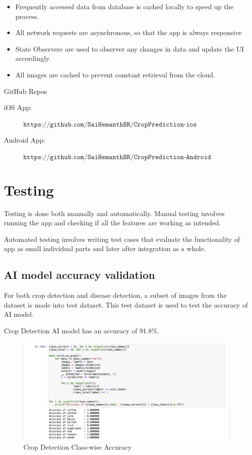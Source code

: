 \documentclass[../Report.tex]{subfiles}
\begin{document}
\begin{itemize}
  \item Frequently accessed data from database is cached locally to speed up the process.
  \item All network requests are asynchronous, so that the app is always responsive
  \item State Observers are used to observer any changes in data and update the UI accordingly.
  \item All images are cached to prevent constant retrieval from the cloud.
\end{itemize}

\noindent
GitHub Repos
\begin{description}
  \item [iOS App:] $\texttt{https://github.com/SaiHemanthBR/CropPrediction-ios}$
  \item[Android App:] $\texttt{https://github.com/SaiHemanthBR/CropPrediction-Android}$
\end{description}

\section{Testing}

Testing is done both manually and automatically. Manual testing involves running the app and checking if all the features are working as 
intended.\par
Automated testing involves writing test cases that evaluate the functionality of app as small individual parts and later after integration 
as a whole.

\subsection{AI model accuracy validation} \label{sec:ai_testing}

For both crop detection and disease detection, a subset of images from the dataset is made into test dataset. This test dataset is used to 
test the accuracy of AI model.\par

Crop Detection AI model has an accuracy of 91.8\%.
\begin{figure}[H]
  \centering
  \includegraphics[width=\linewidth]{images/crop_class_acc.png}
  \caption{Crop Detection Class-wise Accuracy}
  \label{fig:test_ai_crop_class_acc}
\end{figure}\par
\end{document}
